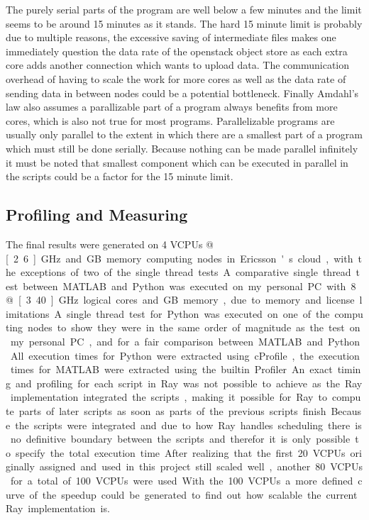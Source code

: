 \documentclass[12pt, a4paper]{article}
\begin{document}
The purely serial parts of the program are well below a few minutes and the limit seems to be around 15 minutes as it stands.
The hard 15 minute limit is probably due to multiple reasons, the excessive saving of intermediate files makes one immediately question the data rate of the openstack object store as each extra core adds another connection which wants to upload data. 
The communication overhead of having to scale the work for more cores as well as the data rate of sending data in between nodes could be a potential bottleneck.
Finally Amdahl's law also assumes a parallizable part of a program always benefits from more cores, which is also not true for most programs.
Parallelizable programs are usually only parallel to the extent in which there are a smallest part of a program which must still be done serially.
Because nothing can be made parallel infinitely it must be noted that smallest component which can be executed in parallel in the scripts could be a factor for the 15 minute limit.


\subsection{Profiling and Measuring}

The final results were generated on 4 VCPUs @ \unit[2.6]{GHz} and \unit[8]{GB} memory computing nodes in Ericsson's cloud, with the exceptions of two of the single thread tests.
A comparative single thread test between MATLAB and Python was executed on my personal PC with 8 @ \unit[3.40]{GHz} logical cores and \unit[36]{GB} memory, due to memory and license limitations. 
A single thread test for Python was executed on one of the computing nodes to show they were in the same order of magnitude as the test on my personal PC, and for a fair comparison between MATLAB and Python.

All execution times for Python were extracted using cProfile, the execution times for MATLAB were extracted using the builtin Profiler.
An exact timing and profiling for each script in Ray was not possible to achieve as the Ray implementation integrated the scripts, making it possible for Ray to compute parts of later scripts as soon as parts of the previous scripts finish.
Because the scripts were integrated and due to how Ray handles scheduling there is no definitive boundary between the scripts and therefor it is only possible to specify the total execution time.

After realizing that the first 20 VCPUs originally assigned and used in this project still scaled well, another 80 VCPUs for a total of 100 VCPUs were used. With the 100 VCPUs a more defined curve of the speedup could be generated to find out how scalable the current Ray implementation is.
\end{document}
